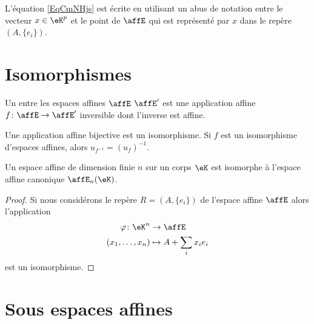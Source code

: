 \begin{remark}
    L'équation \eqref{EqCmNHjs} est écrite en utilisant un abus de notation entre le vecteur \( x\in \eK^p\) et le point de \( \affE\) qui est représenté par \( x\) dans le repère \( (A,\{ e_i \})\).
\end{remark}

\section{Isomorphismes}

\begin{definition}
    Un  entre les espaces affines \( \affE\) \( \affE'\) est une application affine \( f\colon \affE\to \affE'\) inversible dont l'inverse est affine.
\end{definition}

\begin{proposition} \label{PropxtFeDE}
    Une application affine bijective est un isomorphisme. Si \( f\) est un isomorphisme d'espaces affines, alors \( u_{f^{-1}}=(u_f)^{-1}\).
\end{proposition}

\begin{proposition}
    Un espace affine de dimension finie \( n\) sur un corps \( \eK\) est isomorphe à l'espace affine canonique \( \affE_n(\eK)\).
\end{proposition}

\begin{proof}
    Si nous considérons le repère \( R=(A,\{ e_i \})\) de l'espace affine \( \affE\) alors l'application
    \begin{equation}
        \begin{aligned}
            \varphi\colon \eK^n&\to \affE \\
            (x_1,\ldots,x_n)&\mapsto A+\sum_ix_ie_i
        \end{aligned}
    \end{equation}
    est un isomorphisme.
\end{proof}

\section{Sous espaces affines}

